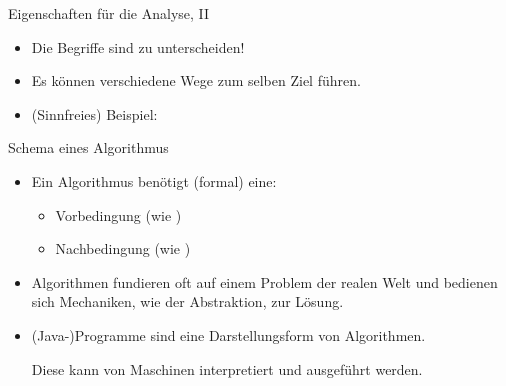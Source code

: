 \begin{frame}{Eigenschaften für die Analyse, II}
    \bigskip
    \begin{itemize}
        \item<6-> Die Begriffe sind zu unterscheiden!
        \item<7-> Es können verschiedene Wege zum selben Ziel führen.
        \item<8-> (Sinnfreies) Beispiel: \smallskip\par
    \end{itemize}
\end{frame}


\begin{frame}{Schema eines Algorithmus}
    \pause\begin{center}
    \end{center}
    \begin{itemize}[<+(1)->]
        \widei
        \item Ein Algorithmus benötigt (formal) eine: \begin{itemize}
            \item Vorbedingung (wie )
            \item Nachbedingung (wie )
        \end{itemize}
        \item Algorithmen fundieren oft auf einem Problem der realen Welt und bedienen sich Mechaniken, wie der Abstraktion, zur Lösung.
        \item (Java-)Programme sind eine Darstellungsform von Algorithmen.\par\pause{}
              Diese kann von Maschinen interpretiert und ausgeführt werden.
     \end{itemize}
\end{frame}

